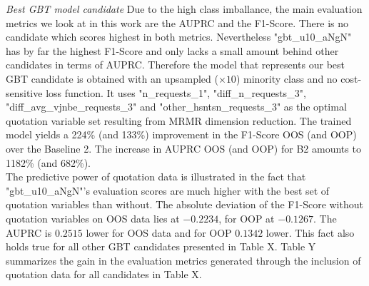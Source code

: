 \documentclass[12pt,titlepage]{article}
\begin{document}
\textit{Best GBT model candidate}
Due to the high class imballance, the main evaluation metrics we look at in this work are the AUPRC and the F1-Score. There is no candidate which scores highest in both metrics. Nevertheless "gbt\_u10\_aNgN" has by far the highest F1-Score and only lacks a small amount behind other candidates in terms of AUPRC. Therefore the model that represents our best GBT candidate is obtained with an upsampled ($\times 10$) minority class and no cost-sensitive loss function. It uses "n\_requests\_1", "diff\_n\_requests\_3", "diff\_avg\_vjnbe\_requests\_3" and "other\_hsntsn\_requests\_3" as the optimal quotation variable set resulting from MRMR dimension reduction.
The trained model yields a 224\% (and 133\%) improvement in the F1-Score OOS (and OOP) over the Baseline 2. The increase in AUPRC OOS (and OOP) for B2 amounts to 1182\% (and 682\%). \\
The predictive power of quotation data is illustrated in the fact that "gbt\_u10\_aNgN"'s evaluation scores are much higher with the best set of quotation variables than without. The absolute deviation of the F1-Score without quotation variables on OOS data lies at $-0.2234$, for OOP at $-0.1267$. The AUPRC is $0.2515$ lower for OOS data and for OOP $0.1342$ lower. This fact also holds true for all other GBT candidates presented in Table X. Table Y summarizes the gain in the evaluation metrics generated through the inclusion of quotation data for all candidates in Table X. \\
\end{document}
